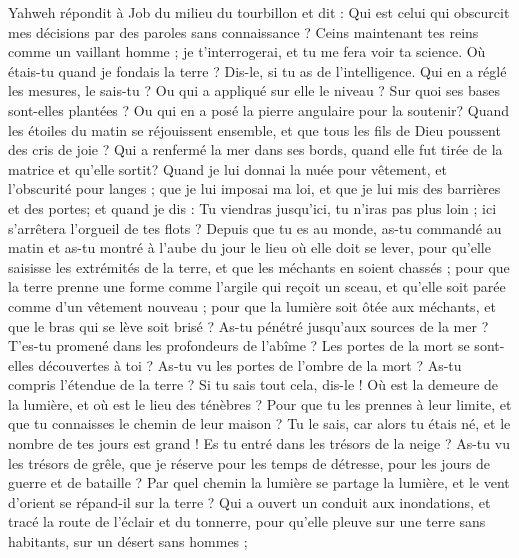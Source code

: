 \begin{multicols}{2}
\VerseOne{}Yahweh répondit à Job du milieu du tourbillon et dit :
Qui est celui qui obscurcit mes décisions par des paroles sans connaissance ?
Ceins maintenant tes reins comme un vaillant homme ; je t'interrogerai, et tu me fera voir ta science.
Où étais-tu quand je fondais la terre ? Dis-le, si tu as de l'intelligence.
Qui en a réglé les mesures, le sais-tu ? Ou qui a appliqué sur elle le niveau ?
Sur quoi ses bases sont-elles plantées ? Ou qui en a posé la pierre angulaire pour la soutenir?
Quand les étoiles du matin se réjouissent ensemble, et que tous les fils de Dieu poussent des cris de joie  ?
Qui a renfermé la mer dans ses bords, quand elle fut tirée de la matrice et qu'elle sortit? 
Quand je lui donnai la nuée pour vêtement, et l'obscurité pour langes ;
que je lui imposai ma loi, et que je lui mis des barrières et des portes;
 et quand je dis : Tu viendras jusqu'ici, tu n'iras pas plus loin ; ici s'arrêtera l'orgueil de tes flots ?
Depuis que tu es au monde, as-tu commandé au matin et as-tu montré à l'aube du jour le lieu où elle doit se lever,
pour qu'elle saisisse les extrémités de la terre, et que les méchants en soient chassés ;
pour que la terre prenne une forme comme l'argile qui reçoit un sceau, et qu'elle soit parée comme d'un vêtement nouveau ;
pour que la lumière soit ôtée aux méchants, et que le bras qui se lève soit brisé ?
As-tu pénétré jusqu'aux sources de la mer ? T'es-tu promené dans les profondeurs de l'abîme ?
Les portes de la mort se sont-elles découvertes à toi ? As-tu vu les portes de l'ombre de la mort ?
As-tu compris l'étendue de la terre ? Si tu sais tout cela, dis-le !
Où est la demeure de la lumière, et où est le lieu des ténèbres ?
Pour que tu les prennes à leur limite, et que tu connaisses le chemin de leur maison ?
Tu le sais, car alors tu étais né, et le nombre de tes jours est grand !
Es tu entré dans les trésors de la neige ? As-tu vu les trésors de grêle,
que je réserve pour les temps de détresse, pour les jours de guerre et de bataille ?
Par quel chemin la lumière se partage la lumière, et le vent d'orient se répand-il sur la terre ?
Qui a ouvert un conduit aux inondations, et tracé la route de l'éclair et du tonnerre,
pour qu'elle pleuve sur une terre sans habitants, sur un désert sans hommes ;

\end{multicols}
